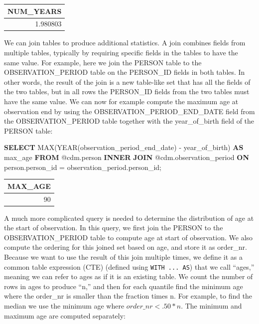 \documentclass[11pt]{book}
\newenvironment{Shaded}{\begin{snugshade}}{\end{snugshade}}
\newcommand{\KeywordTok}[1]{\textcolor[rgb]{0.13,0.29,0.53}{\textbf{#1}}}
\newcommand{\DataTypeTok}[1]{\textcolor[rgb]{0.13,0.29,0.53}{#1}}
\newcommand{\FunctionTok}[1]{\textcolor[rgb]{0.00,0.00,0.00}{#1}}
\newcommand{\NormalTok}[1]{#1}
\theoremstyle{definition}
\theoremstyle{definition}
\theoremstyle{definition}
\theoremstyle{remark}
\begin{document}
\begin{longtable}[]{@{}r@{}}
\toprule
NUM\_YEARS\tabularnewline
\midrule
\endhead
1.980803\tabularnewline
\bottomrule
\end{longtable}

We can join tables to produce additional statistics. A join combines
fields from multiple tables, typically by requiring specific fields in
the tables to have the same value. For example, here we join the PERSON
table to the OBSERVATION\_PERIOD table on the PERSON\_ID fields in both
tables. In other words, the result of the join is a new table-like set
that has all the fields of the two tables, but in all rows the
PERSON\_ID fields from the two tables must have the same value. We can
now for example compute the maximum age at observation end by using the
OBSERVATION\_PERIOD\_END\_DATE field from the OBSERVATION\_PERIOD table
together with the year\_of\_birth field of the PERSON table:

\begin{Shaded}
\begin{Highlighting}[]
\KeywordTok{SELECT} \FunctionTok{MAX}\NormalTok{(}\DataTypeTok{YEAR}\NormalTok{(observation_period_end_date) -}
\NormalTok{           year_of_birth) }\KeywordTok{AS}\NormalTok{ max_age}
\KeywordTok{FROM}\NormalTok{ @cdm.person}
\KeywordTok{INNER} \KeywordTok{JOIN}\NormalTok{ @cdm.observation_period}
  \KeywordTok{ON}\NormalTok{ person.person_id = observation_period.person_id;}
\end{Highlighting}
\end{Shaded}

\begin{longtable}[]{@{}r@{}}
\toprule
MAX\_AGE\tabularnewline
\midrule
\endhead
90\tabularnewline
\bottomrule
\end{longtable}

A much more complicated query is needed to determine the distribution of
age at the start of observation. In this query, we first join the PERSON
to the OBSERVATION\_PERIOD table to compute age at start of observation.
We also compute the ordering for this joined set based on age, and store
it as order\_nr. Because we want to use the result of this join multiple
times, we define it as a common table expression (CTE) (defined using
\texttt{WITH\ ...\ AS}) that we call ``ages,'' meaning we can refer to
ages as if it is an existing table. We count the number of rows in ages
to produce ``n,'' and then for each quantile find the minimum age where
the order\_nr is smaller than the fraction times n. For example, to find
the median we use the minimum age where \(order\_nr < .50 * n\). The
minimum and maximum age are computed separately:
\end{document}
